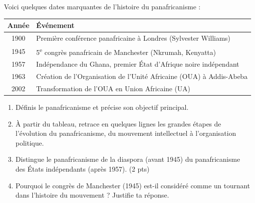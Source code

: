 \documentclass[11pt]{article}
\begin{document}
\begin{exercice}
Voici quelques dates marquantes de l'histoire du panafricanisme :
\begin{center}
\begin{tabular}{|c|p{9cm}|}
\hline
\textbf{Année} & \textbf{Événement} \\
\hline
1900 & Première conférence panafricaine à Londres (Sylvester Williams) \\
\hline
1945 & 5\textsuperscript{e} congrès panafricain de Manchester (Nkrumah, Kenyatta) \\
\hline
1957 & Indépendance du Ghana, premier État d'Afrique noire indépendant \\
\hline
1963 & Création de l'Organisation de l'Unité Africaine (OUA) à Addis-Abeba \\
\hline
2002 & Transformation de l'OUA en Union Africaine (UA) \\
\hline
\end{tabular}
\end{center}
\begin{enumerate}
\item Définis le panafricanisme et précise son objectif principal.
\item À partir du tableau, retrace en quelques lignes les grandes étapes de l'évolution du panafricanisme, du mouvement intellectuel à l'organisation politique.
\item Distingue le panafricanisme de la diaspora (avant 1945) du panafricanisme des États indépendants (après 1957). (2 pts)
\item Pourquoi le congrès de Manchester (1945) est-il considéré comme un tournant dans l'histoire du mouvement ? Justifie ta réponse.
\end{enumerate}
\end{exercice}
\end{document}
